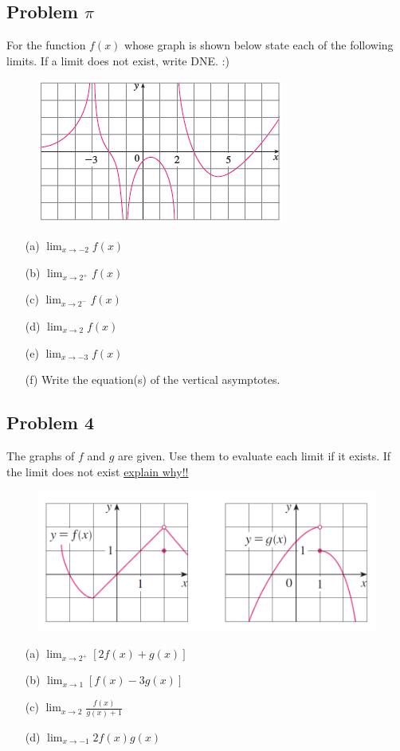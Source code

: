 \documentclass[10pt]{book}
\theoremstyle{definition}
\begin{document}
\subsection*{Problem $\pi$} For the function $f(x)$ whose graph is shown below state each of the following limits. If a limit does not exist, write DNE. :)
\begin{figure}[h]
    \centering
    \includegraphics{fig1.png}
\end{figure}
\begin{itemize}
    \item[(a)] $\displaystyle\lim_{x\rightarrow -2}f(x)$
    \item[(b)] $\displaystyle\lim_{x\rightarrow 2^+}f(x)$
    \item[(c)] $\displaystyle\lim_{x\rightarrow 2^-}f(x)$
    \item[(d)] $\displaystyle\lim_{x\rightarrow 2}f(x)$
    \item[(e)] $\displaystyle\lim_{x\rightarrow -3}f(x)$
    \item[(f)] Write the equation(s) of the vertical asymptotes.
\end{itemize}
\subsection*{Problem 4} The graphs of $f$ and $g$ are given. Use them to evaluate each limit if it exists. If the limit does not exist \underline{explain why!!}
\begin{figure}[h]
    \centering
    \includegraphics[scale=0.65]{fandg.png}
\end{figure}
\begin{itemize}
    \item[(a)] $\displaystyle\lim_{x\rightarrow 2^+}[2f(x)+g(x)]$ \vspace{3mm}
    \item[(b)] $\displaystyle\lim_{x\rightarrow 1}[f(x)-3g(x)]$\vspace{3mm}
    \item[(c)] $\displaystyle\lim_{x\rightarrow 2}\frac{f(x)}{g(x)+1}$\vspace{3mm}
    \item[(d)] $\displaystyle\lim_{x\rightarrow -1}2f(x)g(x)$ 
\end{itemize}
\end{document}
